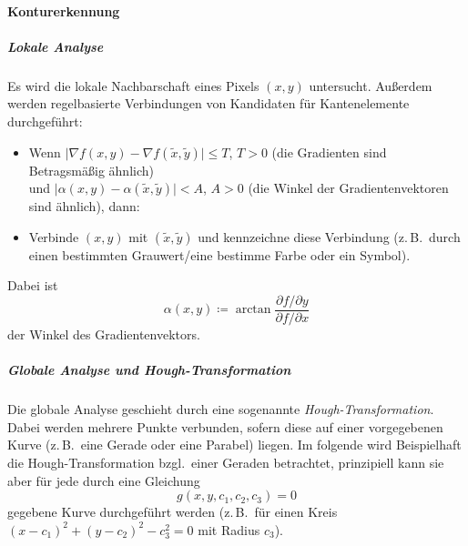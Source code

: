 \documentclass[a4paper, 11pt, accentcolor = tud3b]{tudreport}
\newcommand{\bzgl}{bzgl.~}
\newcommand{\zB}{z.\,B.~}
\begin{document}
					\paragraph{Konturerkennung}
						\subparagraph{Lokale Analyse}
							Es wird die lokale Nachbarschaft eines Pixels \( (x, y) \) untersucht. Außerdem werden regelbasierte Verbindungen von Kandidaten für Kantenelemente durchgeführt:
							\begin{itemize}
								\item Wenn \( \big\lvert \nabla f(x, y) - \nabla f(\tilde{x}, \tilde{y}) \big\rvert \leq T \), \( T > 0 \) (die Gradienten sind Betragsmäßig ähnlich) \\ und \( \big\lvert \alpha(x, y) - \alpha(\tilde{x}, \tilde{y}) \big\rvert < A \), \( A > 0 \) (die Winkel der Gradientenvektoren sind ähnlich), dann:
								\item Verbinde \( (x, y) \) mit \( (\tilde{x}, \tilde{y}) \) und kennzeichne diese Verbindung (\zB durch einen bestimmten Grauwert/eine bestimme Farbe oder ein Symbol).
							\end{itemize}
							Dabei ist
							\begin{equation*}
								\alpha(x, y) \coloneqq \arctan \frac{\partial f / \partial y}{\partial f / \partial x}
							\end{equation*}
							der Winkel des Gradientenvektors.

						\subparagraph{Globale Analyse und Hough-Transformation}
							Die globale Analyse geschieht durch eine sogenannte \emph{Hough-Transformation}. Dabei werden mehrere Punkte verbunden, sofern diese auf einer vorgegebenen Kurve (\zB eine Gerade oder eine Parabel) liegen. Im folgende wird Beispielhaft die Hough-Transformation \bzgl einer Geraden betrachtet, prinzipiell kann sie aber für jede durch eine Gleichung
							\begin{equation*}
								g(x, y, c_1, c_2, c_3) = 0
							\end{equation*}
							gegebene Kurve durchgeführt werden (\zB für einen Kreis \( (x - c_1)^2 + (y - c_2)^2 - c_3^2 = 0 \) mit Radius \( c_3 \)).
							
\end{document}
